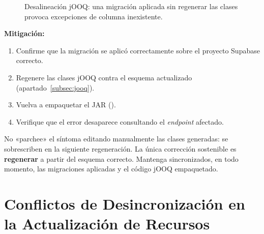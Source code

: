 \vspace{0.3cm}
\begin{figure}[h!]
\centering
{}
\caption{Desalineación jOOQ: una migración aplicada sin regenerar las clases provoca excepciones de columna inexistente.}%
\label{fig:jooq-sync}
\end{figure}

\textbf{Mitigación:}\par
\begin{enumerate}[noitemsep]
    \item Confirme que la migración se aplicó correctamente sobre el proyecto Supabase correcto.
    \item Regenere las clases jOOQ contra el esquema actualizado (apartado~\ref{subsec:jooq}).
    \item Vuelva a empaquetar el JAR ().
    \item Verifique que el error desaparece consultando el \textit{endpoint} afectado.
\end{enumerate}

\begin{AvisoAdvertencia}
No «parchee» el síntoma editando manualmente las clases generadas: se sobrescriben en la
siguiente regeneración. La única corrección sostenible es \textbf{regenerar} a partir del
esquema correcto. Mantenga sincronizados, en todo momento, las migraciones aplicadas y el
código jOOQ empaquetado.
\end{AvisoAdvertencia}

\section{Conflictos de Desincronización en la Actualización de Recursos}%
\label{sec:recursos}

